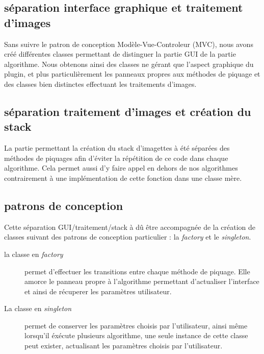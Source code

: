 \subsection*{séparation interface graphique et traitement d'images}
Sans suivre le patron de conception Modèle-Vue-Controleur (MVC), nous avons créé différentes classes permettant de distinguer la partie GUI de la partie algorithme. Nous obtenons ainsi des classes ne gérant que l'aspect graphique du plugin, et plus particulièrement les panneaux propres aux méthodes de piquage et des classes bien distinctes effectuant les traitements d'images.

\subsection*{séparation traitement d'images et création du stack}
La partie permettant la création du stack d'imagettes à été séparées des méthodes de piquages afin d'éviter la répétition de ce code dans chaque algorithme. Cela permet aussi d'y faire appel en dehors de nos algorithmes contrairement à une implémentation de cette fonction dans une classe mère.

\subsection*{patrons de conception}
Cette séparation GUI/traitement/stack à dû être accompagnée de la création de classes suivant des patrons de conception particulier : la \emph{factory} et le \emph{singleton}.
\begin{description}
\item[la classe en \emph{factory}] permet d'effectuer les transitions entre chaque méthode de piquage. Elle amorce le panneau propre à l'algorithme permettant d'actualiser l'interface et ainsi de récuperer les paramètres utilisateur.
\item[La classe en \emph{singleton}] permet de conserver les paramètres choisis par l'utilisateur, ainsi même lorsqu'il éxécute plusieurs algorithme, une seule instance de cette classe peut exister, actualisant les paramètres choisis par l'utilisateur.
\end{description}
%

